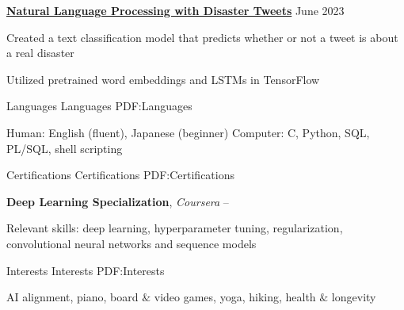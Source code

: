 \documentclass[letterpaper,MMMyyyy,nonstopmode]{simpleresumecv}
\newcommand{\CVNote}{Alexis Garvey Resume}
\begin{document}
\begin{Body}
\vspace{0.1cm}

\Entry
\href{https://github.com/alex-garvey/kaggle-projects}{\textbf{Natural Language Processing with Disaster Tweets}} \hfill June 2023


\par
\BulletItem Created a text classification model that predicts whether or not a tweet is about a real disaster 
\par
\BulletItem Utilized pretrained word embeddings and LSTMs in TensorFlow
\par 


\Section
{Languages}
{Languages}
{PDF:Languages}

\Entry
Human: English (fluent), Japanese (beginner)
\Entry 
Computer: C, Python, SQL, PL/SQL, shell scripting



\Section
{Certifications}
{Certifications}
{PDF:Certifications}

\Entry
\textbf{Deep Learning Specialization}, \textit{Coursera} 
\hfill 
{} --

\par
\BulletItem Relevant skills: deep learning, hyperparameter tuning, regularization, convolutional neural networks and sequence models
\par

\Section
{Interests}
{Interests}
{PDF:Interests}

AI alignment, piano, board $\&$ video games, yoga, hiking, health $\&$ longevity







\end{Body}


\end{document}
